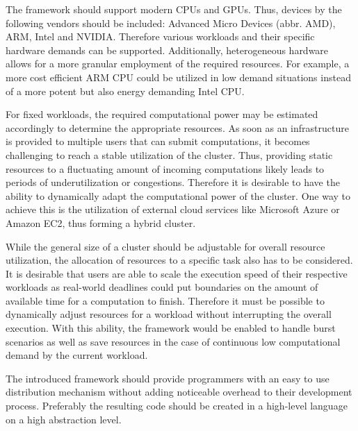 \begin{description}[style=nextline]
    \item [Heterogeneity]
    The framework should support modern CPUs and GPUs. Thus, devices by the following vendors should be included: Advanced Micro Devices (abbr. AMD), ARM, Intel and NVIDIA. Therefore various workloads and their specific hardware demands can be supported. Additionally, heterogeneous hardware allows for a more granular employment of the required resources. For example, a more cost efficient ARM CPU could be utilized in low demand situations instead of a more potent but also energy demanding Intel CPU.

    \item [Resource Scalability]
    For fixed workloads, the required computational power may be estimated accordingly to determine the appropriate resources. As soon as an infrastructure is provided to multiple users that can submit computations, it becomes challenging to reach a stable utilization of the cluster. Thus, providing static resources to a fluctuating amount of incoming computations likely leads to periods of underutilization or congestions. Therefore it is desirable to have the ability to dynamically adapt the computational power of the cluster. One way to achieve this is the utilization of external cloud services like Microsoft Azure or Amazon EC2, thus forming a hybrid cluster.

    \item [Scalable Speed]
    While the general size of a cluster should be adjustable for overall resource utilization, the allocation of resources to a specific task also has to be considered. It is desirable that users are able to scale the execution speed of their respective workloads as real-world deadlines could put boundaries on the amount of available time for a computation to finish. Therefore it must be possible to dynamically adjust resources for a workload without interrupting the overall execution. With this ability, the framework would be enabled to handle burst scenarios as well as save resources in the case of continuous low computational demand by the current workload.

    \item [Ease of Programming]
    The introduced framework should provide programmers with an easy to use distribution mechanism without adding noticeable overhead to their development process. Preferably the resulting code should be created in a high-level language on a high abstraction level.


\end{description}
